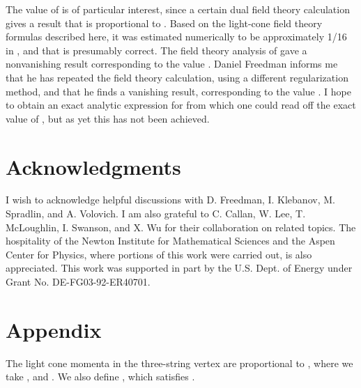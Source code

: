\documentclass[a4paper,12pt]{article}
\begin{document}
The value of \coordHE{} is of particular interest, since a certain dual
field theory calculation gives a result that is proportional to
\coordHE{}. Based on the light-cone field theory formulas
described here, it was estimated numerically to be approximately
1/16 in \cite{Klebanov:2002mp}, and that is presumably correct.
The field theory analysis of \cite{Chu:2002pd} gave a nonvanishing
result corresponding to the value \coordHE{}. Daniel Freedman informs
me that he has repeated the field theory calculation, using a
different regularization method, and that he finds a vanishing
result, corresponding to the value \coordHE{}. I hope to obtain an
exact analytic expression for \coordHE{} from which one could read off
the exact value of \coordHE{}, but as yet this has not been achieved.

\section*{Acknowledgments}
I wish to acknowledge helpful discussions with D. Freedman, I.
Klebanov, M. Spradlin, and A. Volovich. I am also grateful to C.
Callan, W. Lee, T. McLoughlin, I. Swanson, and X. Wu for their
collaboration on related topics. The hospitality of the Newton
Institute for Mathematical Sciences and the Aspen Center for
Physics, where portions of this work were carried out, is also
appreciated. This work was supported in part by the U.S. Dept. of
Energy under Grant No. DE-FG03-92-ER40701.

\section*{Appendix}

The light cone momenta in the three-string vertex are proportional
to \coordHE{}, where we take \coordHE{}, \coordHE{} and \coordHE{}. We also define \coordHE{}, which satisfies \coordHE{}.
\end{document}
